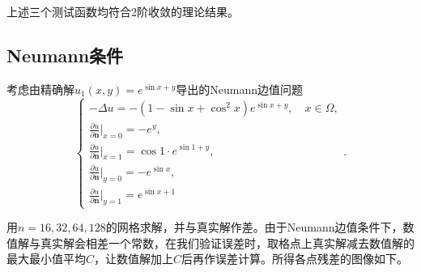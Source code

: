 \documentclass[lang=cn,11pt,a4paper]{elegantpaper}
\begin{document}
上述三个测试函数均符合2阶收敛的理论结果。

\subsection{Neumann条件}

考虑由精确解$u_1(x,y)=e^{\sin x+y}$导出的Neumann边值问题
\begin{equation}
  \left\{
    \begin{array}{l}
      -\Delta u = -(1-\sin x+\cos^2 x)e^{\sin x + y},\quad x\in\Omega, \\
      \frac{\partial u}{\partial \mathbf{n}}|_{x=0}=-e^{y},\\
      \frac{\partial u}{\partial \mathbf{n}}|_{x=1}=\cos 1 \cdot e^{\sin 1 + y},\\
      \frac{\partial u}{\partial \mathbf{n}}|_{y=0}=-e^{\sin x},\\
      \frac{\partial u}{\partial \mathbf{n}}|_{y=1}=e^{\sin x+1}
    \end{array}
  \right. .
\end{equation}

用$n=16,32,64,128$的网格求解，并与真实解作差。由于Neumann边值条件下，数值解与真实解会相差一个常数，在我们验证误差时，取格点上真实解减去数值解的最大最小值平均$C$，让数值解加上$C$后再作误差计算。所得各点残差的图像如下。
\end{document}
